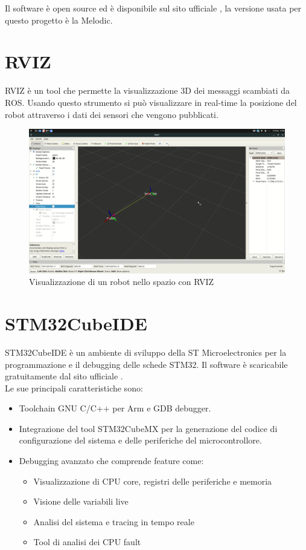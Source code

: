 Il software è open source ed è disponibile sul sito ufficiale \cite{ROS}, la versione usata per questo progetto è la Melodic.

\section{RVIZ}
RVIZ è un tool che permette la visualizzazione 3D dei messaggi scambiati da ROS. Usando questo strumento si può visualizzare in real-time la posizione del robot attraverso i dati dei sensori che vengono pubblicati.

\begin{figure}[H]
\centering
\includegraphics[scale=0.225]{images/rviz.png}
\caption{Visualizzazione di un robot nello spazio con RVIZ}
\end{figure}

\section{STM32CubeIDE}
STM32CubeIDE è un ambiente di sviluppo della ST Microelectronics per la programmazione e il debugging delle schede STM32. Il software è scaricabile gratuitamente dal sito ufficiale \cite{STM32CubeIDE}. \\
Le sue principali caratteristiche sono:
\begin{itemize}
    \item Toolchain GNU C/C++ per Arm e GDB debugger.
    \item Integrazione del tool STM32CubeMX per la generazione del codice di configurazione del sistema e delle periferiche del microcontrollore.
    \item Debugging avanzato che comprende feature come:
    \begin{itemize}
        \item Visualizzazione di CPU core, registri delle periferiche e memoria
        \item Visione delle variabili live 
        \item Analisi del sistema e tracing in tempo reale
        \item Tool di analisi dei CPU fault
    \end{itemize}
\end{itemize}

